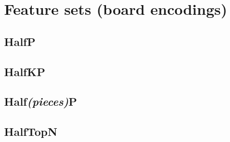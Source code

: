 
\section{Feature sets (board encodings)}
\subsection{HalfP}
\subsection{HalfKP}
\subsection{Half\textit{(pieces)}P}
\subsection{HalfTopN}
